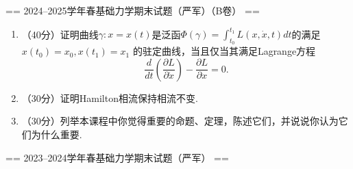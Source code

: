 == 2024--2025学年春基础力学期末试题（严军）（B卷） ==
\begin{enumerate}
\item（40分）证明曲线$\gamma: x=x(t)$是泛函$\Phi(\gamma)=\int_{t_0}^{t_1} L(x, \dot x, t)dt$的满足$x(t_0)=x_0, x(t_1)=x_1$
的驻定曲线，当且仅当其满足Lagrange方程
\[\frac{d}{dt}\left(\frac{\partial L}{\partial \dot x}\right)-\frac{\partial L}{\partial x}=0.\]
\item（30分）证明Hamilton相流保持相流不变.
\item（30分）列举本课程中你觉得重要的命题、定理，陈述它们，并说说你认为它们为什么重要.



\end{enumerate}


== 2023--2024学年春基础力学期末试题（严军） ==

